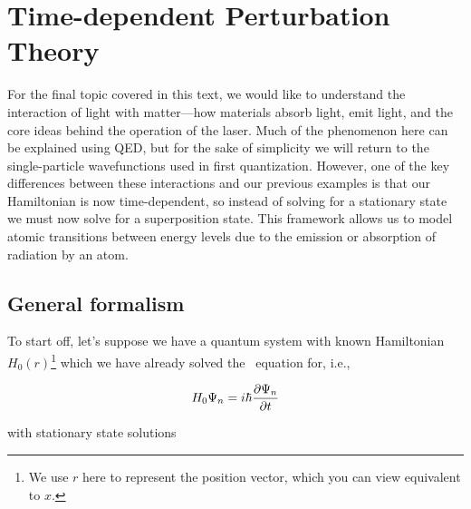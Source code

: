 

%

\chapter[Perturbation Theory]{Time-dependent Perturbation Theory} \label{ch:pert}
For the final topic covered in this text, we would like to understand the interaction of light with matter---how materials absorb light, emit light, and the core ideas behind the operation of the laser. 
Much of the phenomenon here can be explained using QED, but for the sake of simplicity we will return to the single-particle wavefunctions used in first quantization. 
However, one of the key differences between these interactions and our previous examples is that our Hamiltonian is now time-dependent, so instead of solving for a stationary state we must now solve for a superposition state. 
This framework allows us to model atomic transitions between energy levels due to the emission or absorption of radiation by an atom.


\section{General formalism}
To start off, let's suppose we have a quantum system with known Hamiltonian $H_0(r)$\footnote{We use $r$ here to represent the position vector, which you can view equivalent to $x$.} which we have already solved the \Sch\ equation for, i.e.,

\begin{equation*}
	H_0\Psi_n = i\hbar \pdv{\Psi_n}{t}
\end{equation*}

\noindent with stationary state solutions

